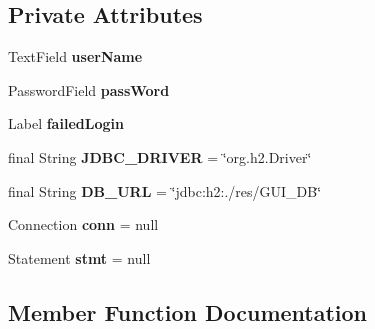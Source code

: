 \subsection*{Private Attributes}
\begin{DoxyCompactItemize}
\item 
\mbox{\label{class_g_u_i_project_1_1_login_page_ab0fe9f74464740231b2a4a93838a09fc}} 
Text\+Field {\bfseries user\+Name}
\item 
\mbox{\label{class_g_u_i_project_1_1_login_page_a2271bdcb5997e333406b2a28a031978b}} 
Password\+Field {\bfseries pass\+Word}
\item 
\mbox{\label{class_g_u_i_project_1_1_login_page_ac6b077fc8a557d03a58b7ecb5b73fa41}} 
Label {\bfseries failed\+Login}
\item 
\mbox{\label{class_g_u_i_project_1_1_login_page_a15234d72964f14c81b39c3dd5391caac}} 
final String {\bfseries J\+D\+B\+C\+\_\+\+D\+R\+I\+V\+ER} = \char`\"{}org.\+h2.\+Driver\char`\"{}
\item 
\mbox{\label{class_g_u_i_project_1_1_login_page_ad23bd511b2afb037418b38f828c61b80}} 
final String {\bfseries D\+B\+\_\+\+U\+RL} = \char`\"{}jdbc\+:h2\+:./res/G\+U\+I\+\_\+\+DB\char`\"{}
\item 
\mbox{\label{class_g_u_i_project_1_1_login_page_ac23c88aac558a63ab928637fc4896190}} 
Connection {\bfseries conn} = null
\item 
\mbox{\label{class_g_u_i_project_1_1_login_page_a90ae81e7366f464f87bd5c194e62c9df}} 
Statement {\bfseries stmt} = null
\end{DoxyCompactItemize}


\subsection{Member Function Documentation}
\mbox{\label{class_g_u_i_project_1_1_login_page_a63b7bf0ce6debc9802d085a742f4a424}} 
